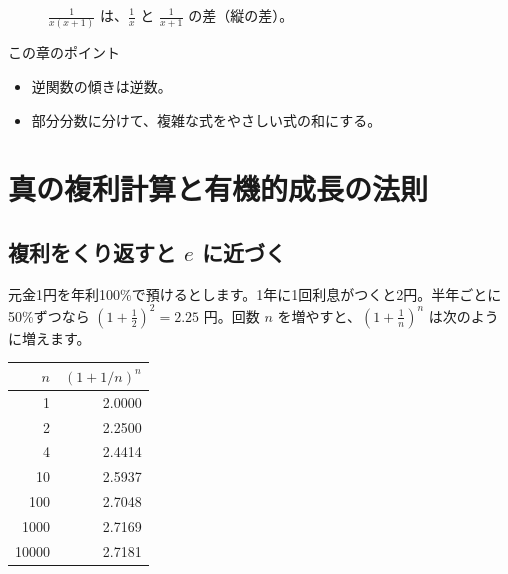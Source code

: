 \documentclass[a4paper,11pt,openany]{ltjsbook}
\begin{document}
\begin{figure}[htbp]
\centering
{}
\caption{$\frac{1}{x(x+1)}$ は、$\frac1x$ と $\frac1{x+1}$ の差（縦の差）。}
\end{figure}

\begin{pointbox}{この章のポイント}
\begin{itemize}[leftmargin=1.5em]
\item 逆関数の傾きは逆数。
\item 部分分数に分けて、複雑な式をやさしい式の和にする。
\end{itemize}
\end{pointbox}

\chapter{真の複利計算と有機的成長の法則}

\section{複利をくり返すと $e$ に近づく}

元金1円を年利100\%で預けるとします。1年に1回利息がつくと2円。半年ごとに50\%ずつなら $(1+\frac12)^2=2.25$ 円。回数 $n$ を増やすと、$(1+\frac1n)^n$ は次のように増えます。

\begin{center}
\begin{tabular}{rr}
\toprule
$n$ & $(1+1/n)^n$ \\
\midrule
1 & 2.0000\\
2 & 2.2500\\
4 & 2.4414\\
10 & 2.5937\\
100 & 2.7048\\
1000 & 2.7169\\
10000 & 2.7181\\
\bottomrule
\end{tabular}
\end{center}
\end{document}
